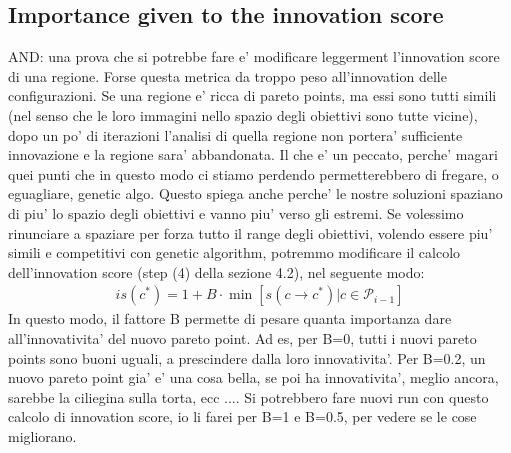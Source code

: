 \subsection{Importance given to the innovation score}
AND: una prova che si potrebbe fare e' modificare leggerment l'innovation score di una regione. Forse questa metrica da troppo peso all'innovation delle configurazioni. Se una regione e' ricca di pareto points, ma essi sono tutti simili (nel senso che le loro immagini nello spazio degli obiettivi sono tutte vicine), dopo un po' di iterazioni l'analisi di quella regione non portera' sufficiente innovazione e la regione sara' abbandonata. Il che e' un peccato, perche' magari quei punti che in questo modo ci stiamo perdendo permetterebbero di fregare, o eguagliare, genetic algo. Questo spiega anche perche' le nostre soluzioni spaziano di piu' lo spazio degli obiettivi e vanno piu' verso gli estremi. Se volessimo rinunciare a spaziare per forza tutto il range degli obiettivi, volendo essere piu' simili e competitivi con genetic algorithm, potremmo modificare il calcolo dell'innovation score (step (4) della sezione 4.2), nel seguente modo:
	\begin{align}
	    is(c^*) = 1 + B\cdot \min[ s(c \rightarrow c^*) | c \in \mathscr{P}_{i-1} ]
	\end{align}
In questo modo, il fattore B permette di pesare quanta importanza dare all'innovativita' del nuovo pareto point. Ad es, per B=0, tutti i nuovi pareto points sono buoni uguali, a prescindere dalla loro innovativita'. Per B=0.2, un nuovo pareto point gia' e' una cosa bella, se poi ha innovativita', meglio ancora, sarebbe la ciliegina sulla torta, ecc .... Si potrebbero fare nuovi run con questo calcolo di innovation score, io li farei per B=1 e B=0.5, per vedere se le cose migliorano.
